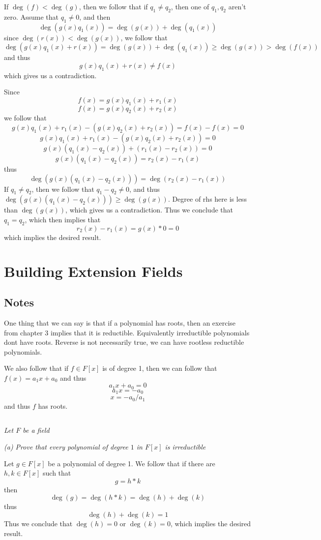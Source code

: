 \documentclass[11pt,oneside,titlepage]{book}
\begin{document}
If $\deg(f) < \deg(g)$, then we follow that if $q_1 \neq q_2$, then
one of $q_1, q_2$ aren't zero. Assume that $q_1 \neq 0$, and then
$$\deg(g(x)q_1(x)) = \deg(g(x)) + \deg(q_1(x))$$
since $\deg(r(x)) < \deg(g(x))$, we follow that
$$\deg(g(x)q_1(x) + r(x)) = \deg(g(x)) + \deg(q_1(x)) \geq \deg(g(x)) > \deg(f(x))$$
and thus
$$g(x)q_1(x) + r(x) \neq f(x)$$
which gives us a contradiction.

Since
$$f(x) = g(x) q_1(x) + r_1(x)$$
$$f(x) = g(x) q_2(x) + r_2(x)$$
we follow that
$$g(x) q_1(x) + r_1(x) - (g(x) q_2(x) + r_2(x)) = f(x) - f(x) = 0$$
$$g(x) q_1(x) + r_1(x) - (g(x) q_2(x) + r_2(x))  = 0$$
$$g(x) (q_1(x) - q_2(x)) + (r_1(x) -  r_2(x))  = 0$$
$$g(x) (q_1(x) - q_2(x)) = r_2(x) - r_1(x)$$
thus
$$\deg(g(x) (q_1(x) - q_2(x))) = \deg(r_2(x) - r_1(x))$$
If $q_1 \neq q_2$, then we follow that $q_1 - q_2 \neq 0$, and thus
$\deg(g(x) (q_1(x) - q_2(x))) \geq \deg(g(x))$. Degree of rhs here is
less than $\deg(g(x))$, which gives us a contradiction. Thus we
conclude that $q_1 = q_2$, which then implies that
$$r_2(x) - r_1(x) = g(x) * 0 = 0$$
which implies the desired result.

\section{Building Extension Fields}

\subsection*{Notes}

One thing that we can say is that if a polynomial has roots, then an
exercise from chapter 3 implies that it is reductible.  Equivalently
irreductible polynomials dont have roots.  Reverse is not necessarily
true, we can have rootless reductible polynomials.

We also follow that if $f \in F[x]$ is of degree 1, then we can follow
that $f(x) = a_1 x + a_0$ and thus
$$a_1 x + a_0 = 0$$
$$a_1 x = - a_0$$
$$ x = - a_0 / a_1$$
and thus $f$ has roots.

\subsection{}

\textit{Let $F$ be a field}

\textit{(a) Prove that every polynomial of degree $1$ in $F[x]$ is
irreductible}

Let $g \in F[x]$ be a polynomial of degree 1. We follow that if there
are $h, k \in F[x]$ such that
$$g = h * k$$
then
$$\deg(g) = \deg(h * k) = \deg(h) + \deg(k)$$
thus
$$\deg(h) + \deg(k) = 1$$
Thus we conclude that $\deg(h) = 0$ or $\deg(k) = 0$, which implies
the desired result.
\end{document}
